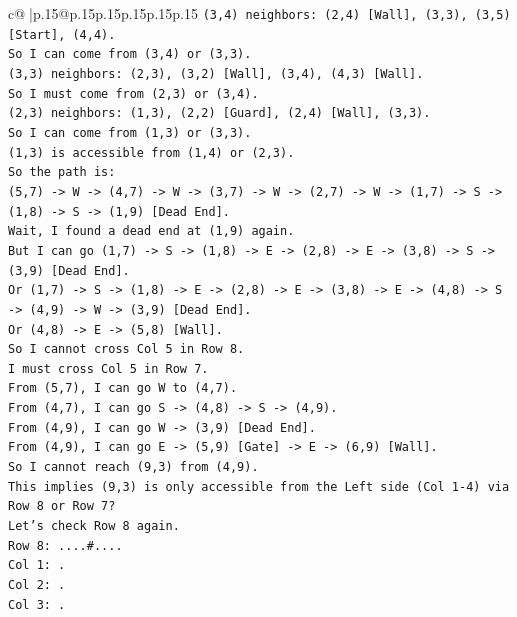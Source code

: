 \documentclass{article}
\begin{document}
{\begin{supertabular}{c@{$\;$}|p{.15\linewidth}@{}p{.15\linewidth}p{.15\linewidth}p{.15\linewidth}p{.15\linewidth}p{.15\linewidth}}
{{{\texttt{(3,4) neighbors: (2,4) {[}Wall{]}, (3,3), (3,5) {[}Start{]}, (4,4).} \\
\texttt{So I can come from (3,4) or (3,3).} \\
\texttt{(3,3) neighbors: (2,3), (3,2) {[}Wall{]}, (3,4), (4,3) {[}Wall{]}.} \\
\texttt{So I must come from (2,3) or (3,4).} \\
\texttt{(2,3) neighbors: (1,3), (2,2) {[}Guard{]}, (2,4) {[}Wall{]}, (3,3).} \\
\texttt{So I can come from (1,3) or (3,3).} \\
\texttt{(1,3) is accessible from (1,4) or (2,3).} \\
\texttt{So the path is:} \\
\texttt{(5,7) {-}> W {-}> (4,7) {-}> W {-}> (3,7) {-}> W {-}> (2,7) {-}> W {-}> (1,7) {-}> S {-}> (1,8) {-}> S {-}> (1,9) {[}Dead End{]}.} \\
\texttt{Wait, I found a dead end at (1,9) again.} \\
\texttt{But I can go (1,7) {-}> S {-}> (1,8) {-}> E {-}> (2,8) {-}> E {-}> (3,8) {-}> S {-}> (3,9) {[}Dead End{]}.} \\
\texttt{Or (1,7) {-}> S {-}> (1,8) {-}> E {-}> (2,8) {-}> E {-}> (3,8) {-}> E {-}> (4,8) {-}> S {-}> (4,9) {-}> W {-}> (3,9) {[}Dead End{]}.} \\
\texttt{Or (4,8) {-}> E {-}> (5,8) {[}Wall{]}.} \\
\texttt{So I cannot cross Col 5 in Row 8.} \\
\texttt{I must cross Col 5 in Row 7.} \\
\texttt{From (5,7), I can go W to (4,7).} \\
\texttt{From (4,7), I can go S {-}> (4,8) {-}> S {-}> (4,9).} \\
\texttt{From (4,9), I can go W {-}> (3,9) {[}Dead End{]}.} \\
\texttt{From (4,9), I can go E {-}> (5,9) {[}Gate{]} {-}> E {-}> (6,9) {[}Wall{]}.} \\
\texttt{So I cannot reach (9,3) from (4,9).} \\
\texttt{This implies (9,3) is only accessible from the Left side (Col 1{-}4) via Row 8 or Row 7?} \\
\texttt{Let's check Row 8 again.} \\
\texttt{Row 8: ....\#....} \\
\texttt{Col 1: .} \\
\texttt{Col 2: .} \\
\texttt{Col 3: .} \\
}}}
\end{supertabular}}
\end{document}

